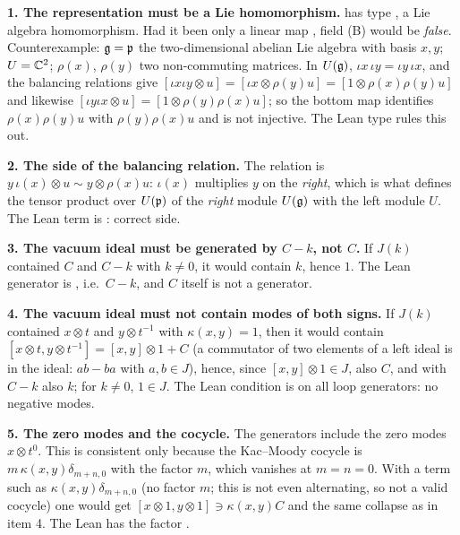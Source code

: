 \begin{warning}
\textbf{1. The representation must be a Lie homomorphism.}  has type
, a Lie algebra homomorphism. Had it been only a linear map
, field (B) would be \emph{false}. Counterexample: $\mathfrak{g} = \mathfrak{p}$ the
two-dimensional abelian Lie algebra with basis $x,y$; $U = {\mathbb{C}}^2$; $\rho(x)$, $\rho(y)$ two
non-commuting matrices. In $U(\mathfrak{g})$, $\iota x\,\iota y = \iota y\,\iota x$, and the balancing relations
give $[\iota x\iota y\otimes u] = [\iota x\otimes\rho(y)u] = [1\otimes\rho(x)\rho(y)u]$ and likewise
$[\iota y\iota x\otimes u] = [1\otimes\rho(y)\rho(x)u]$; so the bottom map identifies $\rho(x)\rho(y)u$ with
$\rho(y)\rho(x)u$ and is not injective. The Lean type rules this out.

\textbf{2. The side of the balancing relation.} The relation is $y\,\iota(x)\otimes u\sim y\otimes\rho(x)u$:
$\iota(x)$ multiplies $y$ on the \emph{right}, which is what defines the tensor product over $U(\mathfrak{p})$
of the \emph{right} module $U(\mathfrak{g})$ with the left module $U$. The Lean term is
: correct side.

\textbf{3. The vacuum ideal must be generated by $C-k$, not $C$.} If $J(k)$ contained $C$ and $C-k$
with $k\ne0$, it would contain $k$, hence $1$. The Lean generator is
, i.e.\ $C-k$, and $C$ itself is not a generator.

\textbf{4. The vacuum ideal must not contain modes of both signs.} If $J(k)$ contained $x\otimes t$ and
$y\otimes t^{-1}$ with $\kappa(x,y) = 1$, then it would contain
$[x\otimes t, y\otimes t^{-1}] = [x,y]\otimes1 + C$ (a commutator of two elements of a left ideal is in the
ideal: $ab - ba$ with $a,b\in J$), hence, since $[x,y]\otimes 1\in J$, also $C$, and with $C-k$ also $k$;
for $k\ne0$, $1\in J$. The Lean condition is  on all loop generators: no negative modes.

\textbf{5. The zero modes and the cocycle.} The generators include the zero modes $x\otimes t^0$. This
is consistent only because the Kac--Moody cocycle is $m\,\kappa(x,y)\delta_{m+n,0}$ with the factor $m$,
which vanishes at $m=n=0$. With a term such as $\kappa(x,y)\delta_{m+n,0}$ (no factor $m$; this is
not even alternating, so not a valid cocycle) one would get $[x\otimes1,y\otimes1]\ni\kappa(x,y)C$ and the same collapse as in item 4.
The Lean  has the factor .


\end{warning}
